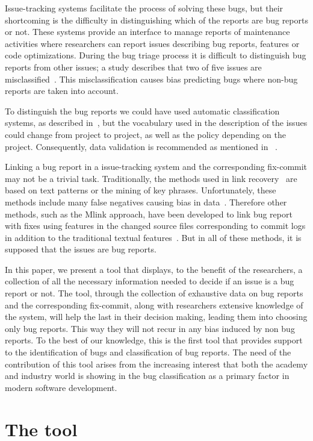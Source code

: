 \documentclass[runningheads,a4paper]{llncs}
\begin{document}
Issue-tracking systems facilitate the process of solving these bugs, but their shortcoming is the difficulty in distinguishing which of the reports are bug reports or not. These systems provide an interface to manage reports of maintenance activities where researchers can report issues describing bug reports, features or code optimizations. During the bug triage process it is difficult to distinguish bug reports from other issues; a study describes that two of five issues are misclassified~\cite{Herzig}. This misclassification causes bias predicting bugs where non-bug reports are taken into account.

To distinguish the bug reports we could have used automatic classification systems, as described in~\cite{Antoniol}, but the vocabulary used in the description of the issues could change from project to project, as well as the policy depending on the project. Consequently, data validation is recommended as mentioned in ~\cite{Herzig}.

Linking a bug report in a issue-tracking system and the corresponding fix-commit may not be a trivial task. Traditionally, the methods used in link recovery~\cite{Zimmermann,Thomas} are based on text patterns or the mining of key phrases. Unfortunately, these methods include many false negatives causing bias in data~\cite{Bird,NguyenTH}. Therefore other methods, such as the Mlink approach, have been developed to link bug report with fixes using features in the changed source files corresponding to commit logs in addition to the traditional textual features~\cite{Nguyen}. But in all of these methods, it is supposed that the issues are bug reports.

In this paper, we present a tool that displays, to the benefit of the researchers, a collection of all the necessary information needed to decide if an issue is a bug report or not. The tool, through the collection of exhaustive data on bug reports and the corresponding fix-commit, along with researchers extensive knowledge of the system, will help the last in their decision making, leading them into choosing only bug reports. This way they will not recur in any bias induced by non bug reports. To the best of our knowledge, this is the first tool that provides support to the identification of bugs and classification of bug reports. The need of the contribution of this tool arises from the increasing interest that both the academy and industry world is showing in the bug classification as a primary factor in modern software development.   
\section{The tool}
\label{sec:2}
\end{document}
